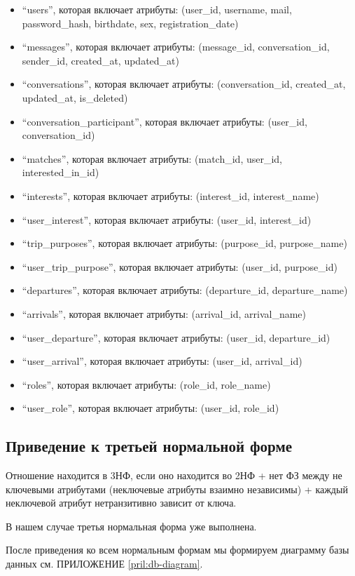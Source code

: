 \begin{itemize}
    \item “users”, которая включает атрибуты: (user\_id, username, mail, password\_hash, birthdate, sex, registration\_date)
    \item “messages”, которая включает атрибуты: (message\_id, conversation\_id, sender\_id, created\_at, updated\_at)
    \item “conversations”, которая включает атрибуты: (conversation\_id, created\_at, updated\_at, is\_deleted)
    \item “conversation\_participant”, которая включает атрибуты: (user\_id, conversation\_id)
    \item “matches”, которая включает атрибуты: (match\_id, user\_id, interested\_in\_id)
    \item “interests”, которая включает атрибуты: (interest\_id, interest\_name)
    \item “user\_interest”, которая включает атрибуты: (user\_id, interest\_id)
    \item “trip\_purposes”, которая включает атрибуты: (purpose\_id, purpose\_name)
    \item “user\_trip\_purpose”, которая включает атрибуты: (user\_id, purpose\_id)
    \item “departures”, которая включает атрибуты: (departure\_id, departure\_name)
    \item “arrivals”, которая включает атрибуты: (arrival\_id, arrival\_name)
    \item “user\_departure”, которая включает атрибуты: (user\_id, departure\_id)
    \item “user\_arrival”, которая включает атрибуты: (user\_id, arrival\_id)
    \item “roles”, которая включает атрибуты: (role\_id, role\_name)
    \item “user\_role”, которая включает атрибуты: (user\_id, role\_id)
\end{itemize}

\subsection{Приведение к третьей нормальной форме}

Отношение находится в 3НФ, если оно находится во 2НФ + нет ФЗ между не ключевыми атрибутами (неключевые атрибуты взаимно независимы) + каждый неключевой атрибут нетранзитивно зависит от ключа.

В нашем случае третья нормальная форма уже выполнена.

После приведения ко всем нормальным формам мы формируем диаграмму базы данных см. ПРИЛОЖЕНИЕ \ref{pril:db-diagram}.

